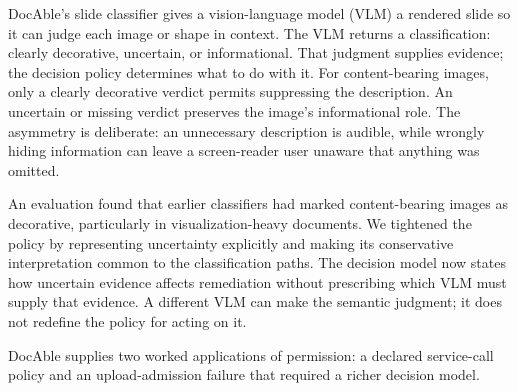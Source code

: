 DocAble's slide classifier gives a vision-language model (VLM) a rendered slide so it can judge each image or shape in context. The VLM returns a classification: clearly decorative, uncertain, or informational. That judgment supplies evidence; the decision policy determines what to do with it. For content-bearing images, only a clearly decorative verdict permits suppressing the description. An uncertain or missing verdict preserves the image's informational role. The asymmetry is deliberate: an unnecessary description is audible, while wrongly hiding information can leave a screen-reader user unaware that anything was omitted.

An evaluation found that earlier classifiers had marked content-bearing images as decorative, particularly in visualization-heavy documents. We tightened the policy by representing uncertainty explicitly and making its conservative interpretation common to the classification paths. The decision model now states how uncertain evidence affects remediation without prescribing which VLM must supply that evidence. A different VLM can make the semantic judgment; it does not redefine the policy for acting on it.

DocAble supplies two worked applications of permission: a declared service-call policy and an upload-admission failure that required a richer decision model.





